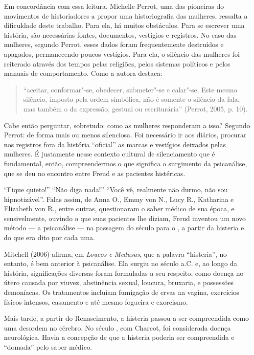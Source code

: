 Em concordância com essa leitura, Michelle Perrot, uma das pioneiras do
movimentos de historiadores a propor uma historiografia das mulheres,
ressalta a dificuldade deste trabalho. Para ela, há muitos obstáculos.
Para se escrever uma história, são necessárias fontes, documentos,
vestígios e registros. No caso das mulheres, segundo Perrot, esses dados
foram frequentemente destruídos e apagados, permanecendo poucos
vestígios. Para ela, o silêncio das mulheres foi reiterado através dos
tempos pelas religiões, pelos sistemas políticos e pelos manuais de
comportamento. Como a autora destaca:

\begin{quote}
``aceitar, conformar"-se, obedecer, submeter"-se e calar"-se. Este mesmo
silêncio, imposto pela ordem simbólica, não é somente o silêncio da
fala, mas também o da expressão, gestual ou escriturária'' (Perrot,
2005, p. 10).
\end{quote}

Cabe então perguntar, sobretudo: como as mulheres responderam a isso?
Segundo Perrot: de forma mais ou menos silenciosa. Foi necessário ir aos
diários, procurar nos registros fora da história ``oficial'' as marcas e
vestígios deixados pelas mulheres. É justamente nesse contexto cultural
de silenciamento que é fundamental, então, compreendermos o que
significa o surgimento da psicanálise, que se deu no encontro entre
Freud e as pacientes histéricas.

``Fique quieto!'' ``Não diga nada!'' ``Você vê, realmente não durmo, não
sou hipnotizável''. Falas assim, de Anna O., Emmy von N., Lucy R.,
Katharina e Elizabeth von R., entre outras, questionaram o saber médico
de sua época, e sensivelmente, ouvindo o que suas pacientes lhe diziam,
Freud inventou um novo método --- a psicanálise --- na passagem do século
 para o , a partir da histeria e do que era dito por cada uma.

Mitchell (2006) afirma, em \emph{Loucos e Medusas}, que a palavra
``histeria'', no entanto, é bem anterior à psicanálise. Ela surgiu no
século  a.C. e, ao longo da história, significações diversas foram
formuladas a seu respeito, como doença no útero causada por viuvez,
abstinência sexual, loucura, bruxaria, e possessões demoníacas. Os
tratamentos incluíam fumigação de ervas na vagina, exercícios físicos
intensos, casamento e até mesmo fogueira e exorcismo.

Mais tarde, a partir do Renascimento, a histeria passou a ser
compreendida como uma desordem no cérebro. No século , com Charcot,
foi considerada doença neurológica. Havia a concepção de que a histeria
poderia ser compreendida e ``domada'' pelo saber médico.

